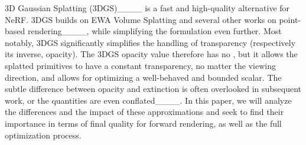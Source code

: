 3D Gaussian Splatting (3DGS)____ is a fast and high-quality alternative for NeRF.
3DGS builds on EWA Volume Splatting and several other works on point-based rendering____, while simplifying the formulation even further.
Most notably, 3DGS significantly simplifies the handling of transparency (respectively its inverse, opacity). 
The 3DGS opacity value therefore has no , but it allows the splatted primitives to have a constant transparency, no matter the viewing direction, and allows for optimizing a well-behaved and bounded scalar.
The subtle difference between opacity and extinction is often overlooked in subsequent work, or the quantities are even conflated____.
In this paper, we will analyze the differences and the impact of these approximations and seek to find their importance in terms of final quality for forward rendering, as well as the full optimization process.

